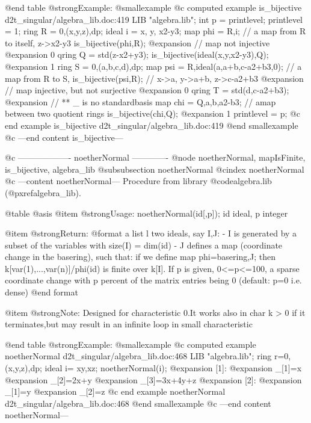 @end table
@strong{Example:}
@smallexample
@c computed example is_bijective d2t_singular/algebra_lib.doc:419 
LIB "algebra.lib";
int p = printlevel;  printlevel = 1;
ring R = 0,(x,y,z),dp;
ideal i = x, y, x2-y3;
map phi = R,i;                      // a map from R to itself, z->x2-y3
is_bijective(phi,R);
@expansion{} // map not injective
@expansion{} 0
qring Q = std(z-x2+y3);
is_bijective(ideal(x,y,x2-y3),Q);
@expansion{} 1
ring S = 0,(a,b,c,d),dp;
map psi = R,ideal(a,a+b,c-a2+b3,0); // a map from R to S,
is_bijective(psi,R);                // x->a, y->a+b, z->c-a2+b3
@expansion{} // map injective, but not surjective
@expansion{} 0
qring T = std(d,c-a2+b3);
@expansion{} // ** _ is no standardbasis
map chi = Q,a,b,a2-b3;              // amap between two quotient rings
is_bijective(chi,Q);
@expansion{} 1
printlevel = p;
@c end example is_bijective d2t_singular/algebra_lib.doc:419
@end smallexample
@c ---end content is_bijective---

@c ------------------- noetherNormal -------------
@node noetherNormal, mapIsFinite, is_bijective, algebra_lib
@subsubsection noetherNormal
@cindex noetherNormal
@c ---content noetherNormal---
Procedure from library @code{algebra.lib} (@pxref{algebra_lib}).

@table @asis
@item @strong{Usage:}
noetherNormal(id[,p]); id ideal, p integer

@item @strong{Return:}
@format	
         a list l two ideals, say I,J:
         - I is generated by a subset of the variables with size(I) = dim(id)
         - J defines a map (coordinate change in the basering), such that:
           if we define  map phi=basering,J;
           then k[var(1),...,var(n)]/phi(id) is finite over k[I].
         If p is given, 0<=p<=100, a sparse coordinate change with p percent
         of the matrix entries being 0 (default: p=0 i.e. dense)
@end format

@item @strong{Note:}
Designed for characteristic 0.It works also in char k > 0 if it
terminates,but may result in an infinite loop in small characteristic

@end table
@strong{Example:}
@smallexample
@c computed example noetherNormal d2t_singular/algebra_lib.doc:468 
LIB "algebra.lib";
ring r=0,(x,y,z),dp;
ideal i= xy,xz;
noetherNormal(i);
@expansion{} [1]:
@expansion{}    _[1]=x
@expansion{}    _[2]=2x+y
@expansion{}    _[3]=3x+4y+z
@expansion{} [2]:
@expansion{}    _[1]=y
@expansion{}    _[2]=z
@c end example noetherNormal d2t_singular/algebra_lib.doc:468
@end smallexample
@c ---end content noetherNormal---

